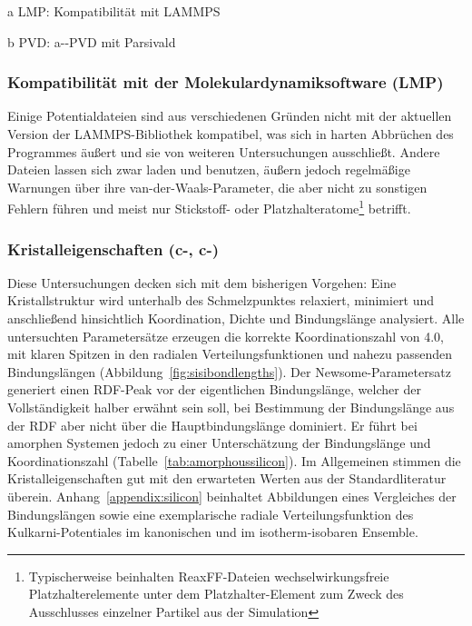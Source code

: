 \begin{table}
\begin{threeparttable}

    \begin{tablenotes}[para]
      \item[a] LMP: Kompatibilität mit LAMMPS
      \item[b] PVD: a--PVD mit Parsivald
    \end{tablenotes}
  \end{threeparttable}
\end{table}

\subsubsection{Kompatibilität mit der Molekulardynamiksoftware (LMP)}

Einige Potentialdateien sind aus verschiedenen Gründen nicht mit der aktuellen Version der LAMMPS-Bibliothek kompatibel, was sich in harten Abbrüchen des Programmes äußert und sie von weiteren Untersuchungen ausschließt.
Andere Dateien lassen sich zwar laden und benutzen, äußern jedoch regelmäßige Warnungen über ihre van-der-Waals-Parameter, die aber nicht zu sonstigen Fehlern führen und meist nur Stickstoff- oder Platzhalteratome\footnote{Typischerweise beinhalten ReaxFF-Dateien wechselwirkungsfreie Platzhalterelemente unter dem Platzhalter-Element  zum Zweck des Ausschlusses einzelner Partikel aus der Simulation} betrifft.

\subsubsection{Kristalleigenschaften (c-, c-)}

Diese Untersuchungen decken sich mit dem bisherigen Vorgehen:
Eine Kristallstruktur wird unterhalb des Schmelzpunktes relaxiert, minimiert und anschließend hinsichtlich Koordination, Dichte und Bindungslänge analysiert.
Alle untersuchten Parametersätze erzeugen die korrekte Koordinationszahl von 4.0, mit klaren Spitzen in den radialen Verteilungsfunktionen und nahezu passenden Bindungslängen (Abbildung~\ref{fig:sisibondlengths}).
Der Newsome-Parametersatz generiert einen RDF-Peak vor der eigentlichen Bindungslänge, welcher der Vollständigkeit halber erwähnt sein soll, bei Bestimmung der Bindungslänge aus der RDF aber nicht über die Hauptbindungslänge dominiert.
Er führt bei amorphen Systemen jedoch zu einer Unterschätzung der Bindungslänge und Koordinationszahl (Tabelle~\ref{tab:amorphoussilicon}).
Im Allgemeinen stimmen die Kristalleigenschaften gut mit den erwarteten Werten aus der Standardliteratur überein.
Anhang~\ref{appendix:silicon} beinhaltet Abbildungen eines Vergleiches der Bindungslängen sowie eine exemplarische radiale Verteilungsfunktion des Kulkarni-Potentiales im kanonischen und im isotherm-isobaren Ensemble.

